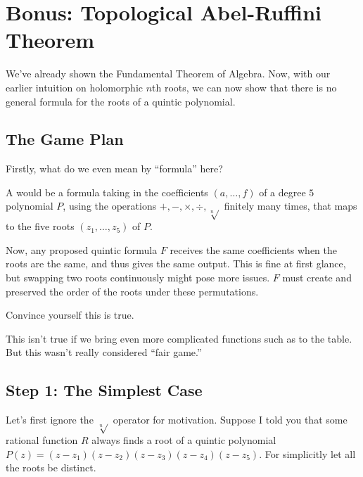 \chapter{Bonus: Topological Abel-Ruffini Theorem}

We've already shown the Fundamental Theorem of Algebra.
Now, with our earlier intuition on holomorphic $n$th roots,
we can now show that there is no general formula for 
the roots of a quintic polynomial.

\section{The Game Plan}

Firstly, what do we even mean by ``formula'' here?

\begin{definition}
    A  would be a formula taking in the coefficients $(a, \dots, f)$ of a 
    degree $5$ polynomial $P$, using the operations $+, -, \times, \div, \sqrt[n]{}$ 
    finitely many times, that maps to the five roots $(z_1, \dots, z_5)$ of $P$.
\end{definition}

Now, any proposed quintic formula $F$ receives the same coefficients when the roots are the same,
and thus gives the same output. This is fine at first glance, but swapping two roots continuously 
might pose more issues. $F$ must create and preserved the order of the roots under these permutations.

\begin{ques}
    Convince yourself this is true.
\end{ques}

\begin{remark}
    This isn't true if we bring even more complicated functions 
    such as  to the table. 
    But this wasn't really considered ``fair game.''
\end{remark}

\section{Step 1: The Simplest Case}

Let's first ignore the $\sqrt[n]{}$ operator for motivation.
Suppose I told you that some rational function $R$ always finds 
a root of a quintic polynomial $P(z) = (z - z_1)(z - z_2)(z - z_3)(z - z_4)(z - z_5)$.
For simplicitly let all the roots be distinct.

